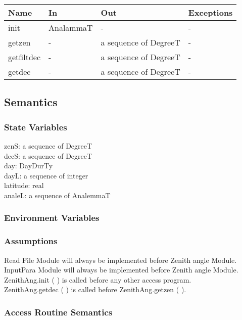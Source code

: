 \documentclass[12pt, titlepage]{article}
\begin{document}
\begin{center}
\begin{tabular}{p{2cm} p{4cm} p{4cm} p{2cm}}
\hline
\textbf{Name} & \textbf{In} & \textbf{Out} & \textbf{Exceptions} \\
\hline 
init & AnalammaT & -  & -\\
getzen &  -  & a sequence of DegreeT & - \\
getfiltdec &  -  & a sequence of DegreeT & - \\
getdec & - & a sequence of DegreeT & - \\

\hline
\end{tabular}
\end{center}


\subsection{Semantics}

\subsubsection{State Variables}

zenS: a sequence of DegreeT\\
decS: a sequence of DegreeT\\
day: DayDurTy\\
dayL: a sequence of integer\\
latitude: real\\
analeL: a sequence of AnalemmaT

\subsubsection{Environment Variables}




\subsubsection{Assumptions}
Read File Module will always be implemented before Zenith angle Module.\\
InputPara Module will always be implemented before Zenith angle Module.\\
ZenithAng.init ( ) is called before any other access program.\\
ZenithAng.getdec ( ) is called before ZenithAng.getzen ( ).\\

\subsubsection{ Access Routine Semantics}
\end{document}
